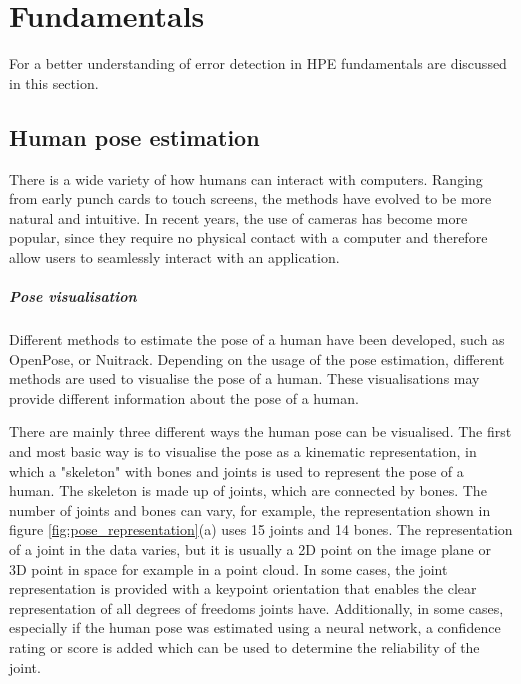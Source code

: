 \chapter{Fundamentals}
\label{sec:fundamentals}

For a better understanding of error detection in HPE fundamentals are discussed in this section. 

\section{Human pose estimation}

There is a wide variety of how humans can interact with computers. Ranging from early punch cards to touch screens, the methods have evolved to be more natural and intuitive. In recent years, the use of cameras has become more popular, since they require no physical contact with a computer and therefore allow users to seamlessly interact with an application.

\paragraph{Pose visualisation}

Different methods to estimate the pose of a human have been developed, such as OpenPose, or Nuitrack. Depending on the usage of the pose estimation, different methods are used to visualise the pose of a human. These visualisations may provide different information about the pose of a human.

There are mainly three different ways the human pose can be visualised. The first and most basic way is to visualise the pose as a kinematic representation, in which a "skeleton" with bones and joints is used to represent the pose of a human. The skeleton is made up of joints, which are connected by bones. The number of joints and bones can vary, for example, the representation shown in figure \ref{fig:pose_representation}(a) uses 15 joints and 14 bones. The representation of a joint in the data varies, but it is usually a 2D point on the image plane or 3D point in space for example in a point cloud. In some cases, the joint representation is provided with a keypoint orientation that enables the clear representation of all degrees of freedoms joints have\cite{KeypointOrientation}. Additionally, in some cases, especially if the human pose was estimated using a neural network, a confidence rating or score is added which can be used to determine the reliability of the joint.

